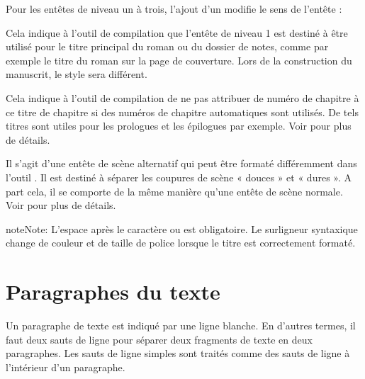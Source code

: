 \documentclass[a4paper,11pt,french]{sphinxmanual}
\begin{document}
\sphinxAtStartPar
Pour les en\sphinxhyphen{}têtes de niveau un à trois, l’ajout d’un \sphinxcode{\sphinxupquote{!}} modifie le sens de l’en\sphinxhyphen{}tête :
\begin{description}
\sphinxAtStartPar
Cela indique à l’outil de compilation que l’en\sphinxhyphen{}tête de niveau 1 est destiné à être utilisé pour le titre principal du roman ou du dossier de notes, comme par exemple le titre du roman sur la page de couverture. Lors de la construction du manuscrit, le style sera différent.

\sphinxAtStartPar
Cela indique à l’outil de compilation de ne pas attribuer de numéro de chapitre à ce titre de chapitre si des numéros de chapitre automatiques sont utilisés. De tels titres sont utiles pour les prologues et les épilogues par exemple. Voir {\hyperref[\detokenize{project_structure:a-struct-heads-unnum}]{}} pour plus de détails.

\sphinxAtStartPar
Il s’agit d’une en\sphinxhyphen{}tête de scène alternatif qui peut être formaté différemment dans l’outil . Il est destiné à séparer les coupures de scène « douces » et « dures ». A part cela, il se comporte de la même manière qu’une en\sphinxhyphen{}tête de scène normale. Voir {\hyperref[\detokenize{project_structure:a-struct-heads-scenes}]{}} pour plus de détails.

\end{description}

\begin{sphinxadmonition}{note}{Note:}
\sphinxAtStartPar
L’espace après le caractère \sphinxcode{\sphinxupquote{\#}} ou \sphinxcode{\sphinxupquote{!}} est obligatoire. Le surligneur syntaxique change de couleur et de taille de police lorsque le titre est correctement formaté.
\end{sphinxadmonition}


\section{Paragraphes du texte}
\label{\detokenize{usage_format:text-paragraphs}}\label{\detokenize{usage_format:a-fmt-text}}
\sphinxAtStartPar
Un paragraphe de texte est indiqué par une ligne blanche. En d’autres termes, il faut deux sauts de ligne pour séparer deux fragments de texte en deux paragraphes. Les sauts de ligne simples sont traités comme des sauts de ligne à l’intérieur d’un paragraphe.
\end{document}
